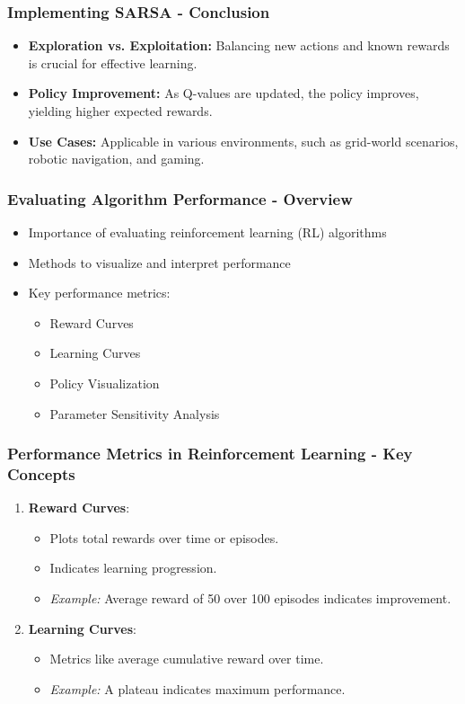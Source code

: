 \documentclass[aspectratio=169]{beamer}
\begin{document}
\begin{frame}[fragile]
    \frametitle{Implementing SARSA - Conclusion}
    \begin{itemize}
        \item \textbf{Exploration vs. Exploitation:} Balancing new actions and known rewards is crucial for effective learning.
        \item \textbf{Policy Improvement:} As Q-values are updated, the policy improves, yielding higher expected rewards.
        \item \textbf{Use Cases:} Applicable in various environments, such as grid-world scenarios, robotic navigation, and gaming.
    \end{itemize}
\end{frame}

\begin{frame}[fragile]
    \frametitle{Evaluating Algorithm Performance - Overview}
    \begin{itemize}
        \item Importance of evaluating reinforcement learning (RL) algorithms
        \item Methods to visualize and interpret performance
        \item Key performance metrics:
        \begin{itemize}
            \item Reward Curves
            \item Learning Curves
            \item Policy Visualization
            \item Parameter Sensitivity Analysis
        \end{itemize}
    \end{itemize}
\end{frame}

\begin{frame}[fragile]
    \frametitle{Performance Metrics in Reinforcement Learning - Key Concepts}
    \begin{enumerate}
        \item \textbf{Reward Curves}:
            \begin{itemize}
                \item Plots total rewards over time or episodes.
                \item Indicates learning progression.
                \item \textit{Example:} Average reward of 50 over 100 episodes indicates improvement.
            \end{itemize}
        \item \textbf{Learning Curves}:
            \begin{itemize}
                \item Metrics like average cumulative reward over time.
                \item \textit{Example:} A plateau indicates maximum performance.
            \end{itemize}
    \end{enumerate}
\end{frame}
\end{document}
